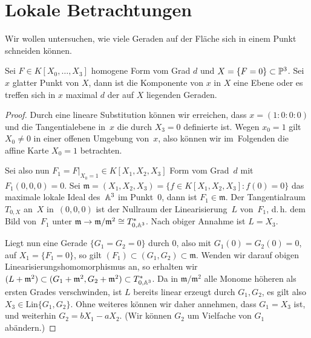 \section{Lokale Betrachtungen}
Wir wollen untersuchen, wie viele Geraden auf der Fläche sich in einem Punkt schneiden können.

\begin{theorem} \label{th:local}
Sei $F \in K[X_0, \dots, X_3]$ homogene Form vom Grad $d$ und $X = \{F = 0\} \subset \mathbb P^{3}$. Sei $x$ glatter Punkt von $X$, dann ist die Komponente von $x$ in $X$ eine Ebene oder es treffen sich in $x$ maximal $d$ der auf $X$ liegenden Geraden.
\end{theorem}
\begin{proof}
Durch eine lineare Substitution können wir erreichen, dass $x = (1:0:0:0)$ und die Tangentialebene in~$x$ die durch $X_3 = 0$ definierte ist. Wegen $x_0 = 1$ gilt $X_0 \neq 0$ in einer offenen Umgebung von~$x$, also können wir im~Folgenden die affine Karte ${X_0 = 1}$ betrachten.

Sei also nun $F_1 = \left. F \right|_{X_0=1} \in K[X_1, X_2, X_3]$ Form vom Grad~$d$ mit $F_1(0,0,0) = 0$. Sei $\mathfrak m = (X_1, X_2, X_3) = \{ f \in K[X_1, X_2, X_3] : f(0) = 0 \}$ das maximale lokale Ideal des~$\mathbb A^{3}$ im Punkt~$0$, dann ist $F_1 \in \mathfrak m$. Der Tangentialraum $T_{0,X}$ an~$X$ in~$(0,0,0)$ ist der Nullraum der Linearisierung~$L$ von~$F_1$, d.\,h. dem Bild von~$F_1$ unter $\mathfrak m \rightarrow \mathfrak m/\mathfrak m^2 \cong T_{0,\mathbb A^{3}}^*$. Nach obiger Annahme ist $L = X_3$.

Liegt nun eine Gerade $\{G_1 = G_2 = 0\}$ durch $0$, also mit $G_1(0) = G_2(0) = 0$, auf $X_1 = \{F_1 = 0\}$, so gilt $(F_1) \subset (G_1, G_2) \subset \mathfrak m$. Wenden wir darauf obigen Linearisierungshomomorphismus an, so erhalten wir $(L + \mathfrak m^2) \subset (G_1 + \mathfrak m^2, G_2 + \mathfrak m^2) \subset T_{0,\mathbb A^{3}}^*$. Da in $\mathfrak m/\mathfrak m^2$ alle Monome höheren als ersten Grades verschwinden, ist $L$ bereits linear erzeugt durch $G_1, G_2$, es gilt also $X_3 \in \mathrm{Lin}\{G_1, G_2\}$. Ohne weiteres können wir daher annehmen, dass $G_1 = X_3$ ist, und weiterhin $G_2 = bX_1 - aX_2$. (Wir können $G_2$ um Vielfache von $G_1$ abändern.)


\end{proof}

